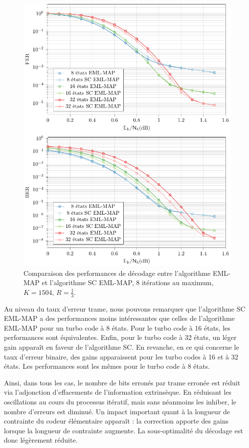 \begin{figure}[!ht]
	\centering
	\includegraphics[width=.9\textwidth]{main/ch2_fig/tikz/sc_8it.pdf}
	\caption{Comparaison des performances de décodage entre l'algorithme EML-MAP et l'algorithme SC EML-MAP, 8 itérations au maximum, $K=1504$, $R=\frac{1}{3}$. \label{fig:sc8it}}
\end{figure}

Au niveau du taux d'erreur trame, nous pouvons remarquer que l'algorithme SC EML-MAP a des performances moins intéressantes que celles de
l'algorithme EML-MAP pour un turbo code à 8 états. Pour le turbo code à 16 états, les performances sont équivalentes. 
Enfin, pour le turbo code à 32 états, un léger gain apparaît en faveur de l'algorithme SC.
En revanche, en ce qui concerne le taux d'erreur binaire, des gains apparaissent pour les turbo codes à 16 et à 32 états. Les performances 
sont les mêmes pour le turbo code à 8 états.

Ainsi, dans tous les cas, le nombre de bits erronés par trame erronée est réduit via l'adjonction \og d'effacements \fg 
de l'information extrinsèque. En réduisant les oscillations au cours du processus itératif, mais sans néanmoins les inhiber,
le nombre d'erreurs est diminué. Un impact important quant à la longueur de contrainte du codeur élémentaire apparaît :
la correction apporte des gains lorsque la longueur de contrainte augmente. La sous-optimalité du décodage est donc légèrement réduite. 

